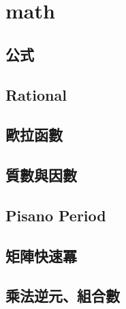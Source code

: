 
%         
%         

\section{math}
    \subsection{公式}
        
    \subsection{Rational}
        
    \subsection{歐拉函數}
        
    \subsection{質數與因數}
        
    \subsection{Pisano Period}
        
    \subsection{矩陣快速冪}
        
    \subsection{乘法逆元、組合數}
        
        
    \columnbreak

